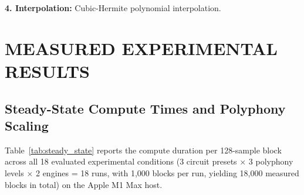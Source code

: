 \documentclass[fleqn,final]{jaes}
\begin{document}
\noindent\textbf{4. Interpolation:} Cubic-Hermite polynomial interpolation.

\section{MEASURED EXPERIMENTAL RESULTS}

\subsection{Steady-State Compute Times and Polyphony Scaling}
Table~\ref{tab:steady_state} reports the compute duration per 128-sample block across all 18 evaluated experimental conditions (3 circuit presets $\times$ 3 polyphony levels $\times$ 2 engines = 18 runs, with 1,000 blocks per run, yielding 18,000 measured blocks in total) on the Apple M1 Max host.
\end{document}
